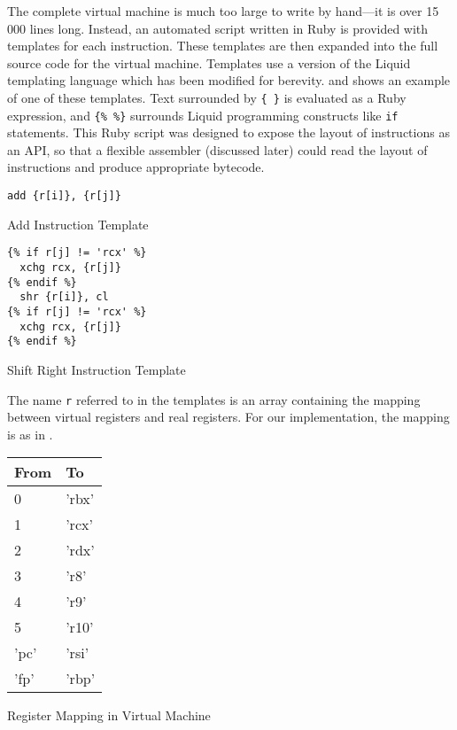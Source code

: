 		The complete virtual machine is much too large to write by hand---it is over 15 000 lines long. Instead, an automated script written in Ruby is provided with templates for each instruction. These templates are then expanded into the full source code for the virtual machine. Templates use a version of the Liquid templating language which has been modified for berevity.  and  shows an example of one of these templates. Text surrounded by \texttt{\{ \}} is evaluated as a Ruby expression, and \texttt{\{\% \%\}} surrounds Liquid programming constructs like \texttt{if} statements. This Ruby script was designed to expose the layout of instructions as an API, so that a flexible assembler (discussed later) could read the layout of instructions and produce appropriate bytecode.
		
		\begin{doublefig}
			\begin{halffig}
				\begin{lstlisting}
add {r[i]}, {r[j]}
				\end{lstlisting}
				\caption{Add Instruction Template}
				\label{fig:addtemplate}
			\end{halffig}
			\begin{halffig}
				\begin{lstlisting}
{% if r[j] != 'rcx' %}
  xchg rcx, {r[j]}
{% endif %}
  shr {r[i]}, cl
{% if r[j] != 'rcx' %}
  xchg rcx, {r[j]}
{% endif %}
				\end{lstlisting}
				\caption{Shift Right Instruction Template}
				\label{fig:shrtemplate}
			\end{halffig}
		\end{doublefig}
		
		The name \texttt{r} referred to in the templates is an array containing the mapping between virtual registers and real registers. For our implementation, the mapping is as in .
		
		\begin{myfigure}
			\begin{tabular}{|l|l|}
				\hline
				From & To \\
				\hline
				0 & 'rbx' \\
				\hline
				1 & 'rcx' \\
				\hline
				2 & 'rdx' \\
				\hline
				3 & 'r8' \\
				\hline
				4 & 'r9' \\
				\hline
				5 & 'r10' \\
				\hline
				'pc' & 'rsi' \\
				\hline
				'fp' & 'rbp' \\ 
				\hline
			\end{tabular}
			\caption{Register Mapping in Virtual Machine}
			\label{fig:regmap}
		\end{myfigure}
		
